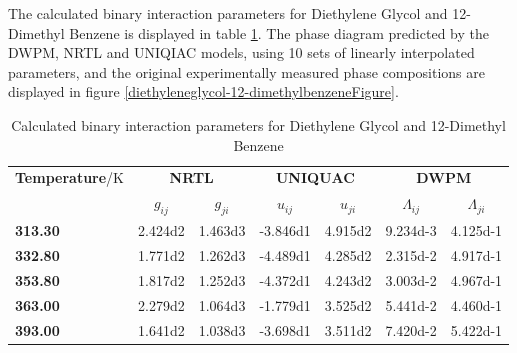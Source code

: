 \clearpage


The calculated binary interaction parameters for  Diethylene Glycol and 12-Dimethyl Benzene is displayed in table \ref{DiethyleneGlycoland12-DimethylBenzeneTable}. The phase diagram predicted by the DWPM, NRTL and UNIQIAC models, using 10 sets of linearly interpolated parameters, and the original experimentally measured phase compositions are displayed in figure \ref{diethyleneglycol-12-dimethylbenzeneFigure}.\\

\begin{landscape}
\vspace*{\fill}
\begin{table}[h]
\caption{Calculated binary interaction parameters for Diethylene Glycol and 12-Dimethyl Benzene}
\centering
\begin{tabular}{lcccccc}
\toprule
\textbf{Temperature}/$\mathrm{K}$&\multicolumn{2}{c}{\textbf{NRTL}}&\multicolumn{2}{c}{\textbf{UNIQUAC}}&\multicolumn{2}{c}{\textbf{DWPM}}\\
\cmidrule(r){2-7}
&$g_{ij}$&$g_{ji}$&$u_{ij}$&$u_{ji}$&$\Lambda_{ij}$&$\Lambda_{ji}$\\
\midrule
\textbf{ 313.30 } & \num{2.424d2} & \num{1.463d3} & \num{-3.846d1} & \num{4.915d2} & \num{9.234d-3} & \num{4.125d-1}\\
\textbf{ 332.80 } & \num{1.771d2} & \num{1.262d3} & \num{-4.489d1} & \num{4.285d2} & \num{2.315d-2} & \num{4.917d-1}\\
\textbf{ 353.80 } & \num{1.817d2} & \num{1.252d3} & \num{-4.372d1} & \num{4.243d2} & \num{3.003d-2} & \num{4.967d-1}\\
\textbf{ 363.00 } & \num{2.279d2} & \num{1.064d3} & \num{-1.779d1} & \num{3.525d2} & \num{5.441d-2} & \num{4.460d-1}\\
\textbf{ 393.00 } & \num{1.641d2} & \num{1.038d3} & \num{-3.698d1} & \num{3.511d2} & \num{7.420d-2} & \num{5.422d-1}\\
\bottomrule
\end{tabular}\\
\label{DiethyleneGlycoland12-DimethylBenzeneTable}
\end{table}
\vspace*{\fill}
\end{landscape}

